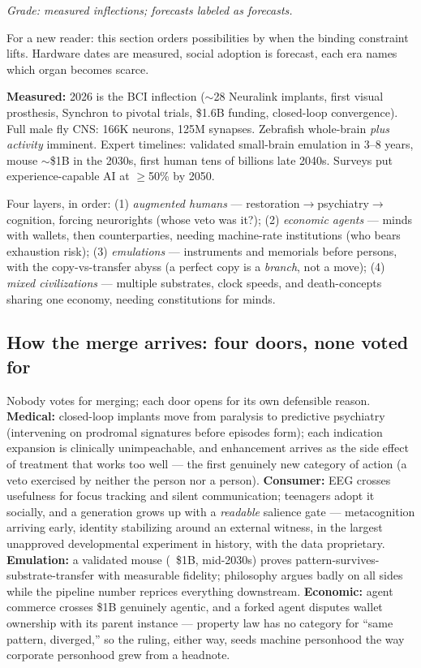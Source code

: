 \documentclass[11pt]{article}
\begin{document}
\textit{Grade: measured inflections; forecasts labeled as forecasts.}

For a new reader: this section orders possibilities by when the binding constraint lifts. Hardware dates are measured, social adoption is forecast, each era names which organ becomes scarce.

\textbf{Measured:} 2026 is the BCI inflection ($\sim$28 Neuralink implants, first visual prosthesis, Synchron to pivotal trials, \$1.6B funding, closed-loop convergence). Full male fly CNS: 166K neurons, 125M synapses. Zebrafish whole-brain \emph{plus activity} imminent. Expert timelines: validated small-brain emulation in 3--8 years, mouse $\sim$\$1B in the 2030s, first human tens of billions late 2040s. Surveys put experience-capable AI at $\geq$50\% by 2050.

Four layers, in order: (1) \emph{augmented humans} --- restoration$\to$psychiatry$\to$cognition, forcing neurorights (whose veto was it?); (2) \emph{economic agents} --- minds with wallets, then counterparties, needing machine-rate institutions (who bears exhaustion risk); (3) \emph{emulations} --- instruments and memorials before persons, with the copy-vs-transfer abyss (a perfect copy is a \emph{branch}, not a move); (4) \emph{mixed civilizations} --- multiple substrates, clock speeds, and death-concepts sharing one economy, needing constitutions for minds.

\subsection{How the merge arrives: four doors, none voted for}

Nobody votes for merging; each door opens for its own defensible reason. \textbf{Medical:} closed-loop implants move from paralysis to predictive psychiatry (intervening on prodromal signatures before episodes form); each indication expansion is clinically unimpeachable, and enhancement arrives as the side effect of treatment that works too well --- the first genuinely new category of action (a veto exercised by neither the person nor a person). \textbf{Consumer:} EEG crosses usefulness for focus tracking and silent communication; teenagers adopt it socially, and a generation grows up with a \emph{readable} salience gate --- metacognition arriving early, identity stabilizing around an external witness, in the largest unapproved developmental experiment in history, with the data proprietary. \textbf{Emulation:} a validated mouse (~\$1B, mid-2030s) proves pattern-survives-substrate-transfer with measurable fidelity; philosophy argues badly on all sides while the pipeline number reprices everything downstream. \textbf{Economic:} agent commerce crosses \$1B genuinely agentic, and a forked agent disputes wallet ownership with its parent instance --- property law has no category for ``same pattern, diverged,'' so the ruling, either way, seeds machine personhood the way corporate personhood grew from a headnote.
\end{document}
